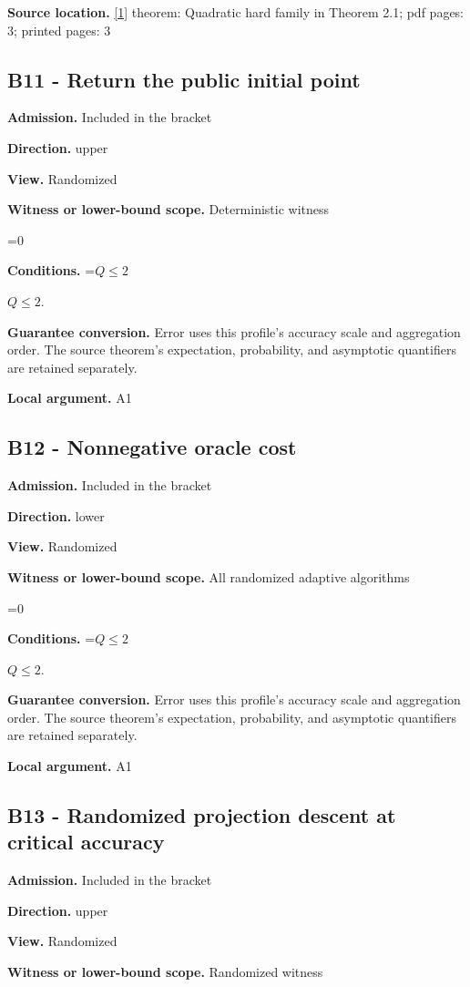 \documentclass[10pt,a4paper]{article}
\newcommand{\AtlasMath}[1]{\par\begingroup\centering\setbox0=\hbox{$\displaystyle #1$}\ifdim\wd0>1.4\linewidth\typeout{ATLAS WIDE FORMULA: \the\wd0}\fi\ifdim\wd0>\linewidth\resizebox{\linewidth}{!}{\box0}\else\box0\fi\par\endgroup}
\newcommand{\AtlasInlineMath}[1]{\begingroup\setbox0=\hbox{$#1$}\ifdim\wd0>.4\linewidth\endgroup\AtlasMath{#1}\else\endgroup$#1$\fi}
\begin{document}
\textbf{Source location.} \href{https://arxiv.org/html/2610.00345v1}{[1]} theorem: Quadratic hard family in Theorem 2.1; pdf pages: 3; printed pages: 3

\subsection{B11 - Return the public initial point}
\textbf{Admission.} Included in the bracket

\textbf{Direction.} upper

\textbf{View.} Randomized

\textbf{Witness or lower-bound scope.} Deterministic witness

\AtlasMath{0}
\textbf{Conditions.} \AtlasInlineMath{Q\le2}.

\textbf{Guarantee conversion.} Error uses this profile's accuracy scale and aggregation order. The source theorem's expectation, probability, and asymptotic quantifiers are retained separately.

\textbf{Local argument.} A1

\subsection{B12 - Nonnegative oracle cost}
\textbf{Admission.} Included in the bracket

\textbf{Direction.} lower

\textbf{View.} Randomized

\textbf{Witness or lower-bound scope.} All randomized adaptive algorithms

\AtlasMath{0}
\textbf{Conditions.} \AtlasInlineMath{Q\le2}.

\textbf{Guarantee conversion.} Error uses this profile's accuracy scale and aggregation order. The source theorem's expectation, probability, and asymptotic quantifiers are retained separately.

\textbf{Local argument.} A1

\subsection{B13 - Randomized projection descent at critical accuracy}
\textbf{Admission.} Included in the bracket

\textbf{Direction.} upper

\textbf{View.} Randomized

\textbf{Witness or lower-bound scope.} Randomized witness
\end{document}
